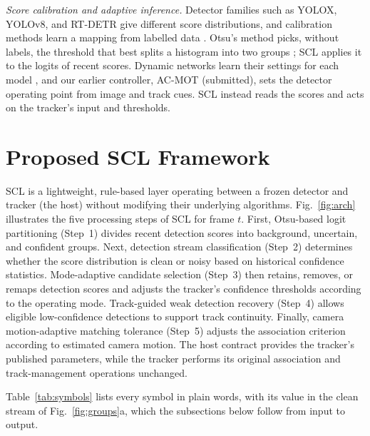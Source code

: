 \documentclass[pdflatex,sn-mathphys-num,iicol]{sn-jnl}
\newcommand{\scl}{SCL}
\begin{document}
\emph{Score calibration and adaptive inference.} Detector families such as YOLOX, YOLOv8, and
RT-DETR give different score distributions, and calibration methods learn a mapping from labelled
data \cite{kuppers2020detcalib}. Otsu's method picks, without labels, the threshold that best splits a
histogram into two groups \cite{goh2018otsu}; \scl{} applies it to the logits of recent scores. Dynamic
networks learn their settings for each model \cite{han2022dynamic}, and our earlier controller,
AC-MOT (submitted), sets the detector operating point from image and track cues. \scl{} instead
reads the scores and acts on the tracker's input and thresholds.
\section{Proposed SCL Framework}\label{sec:method}

\scl{} is a lightweight, rule-based layer operating between a frozen detector and tracker (the
host) without modifying their underlying algorithms. Fig.~\ref{fig:arch} illustrates the five
processing steps of \scl{} for frame $t$. First, Otsu-based logit partitioning (Step~1) divides
recent detection scores into background, uncertain, and confident groups. Next, detection stream
classification (Step~2) determines whether the score distribution is clean or noisy based on
historical confidence statistics. Mode-adaptive candidate selection (Step~3) then retains,
removes, or remaps detection scores and adjusts the tracker's confidence thresholds according to
the operating mode. Track-guided weak detection recovery (Step~4) allows eligible low-confidence
detections to support track continuity. Finally, camera motion-adaptive matching tolerance
(Step~5) adjusts the association criterion according to estimated camera motion. The host
contract provides the tracker's published parameters, while the tracker performs its original
association and track-management operations unchanged.

Table~\ref{tab:symbols} lists every symbol in plain words, with its value in the clean stream of
Fig.~\ref{fig:groups}a, which the subsections below follow from input to output.
\end{document}
